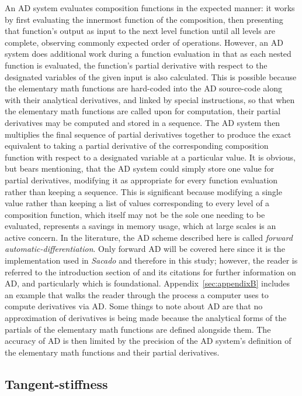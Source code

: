 \documentclass[preprint,12pt]{elsarticle}
\begin{document}
An AD system evaluates composition functions in the expected manner: it works by first evaluating the innermost function of the composition, then presenting that function's output as input to the next level function until all levels are complete, observing commonly expected order of operations. However, an AD system does additional work during a function evaluation in that as each nested function is evaluated, the function's partial derivative with respect to the designated variables of the given input is also calculated.  This is possible because the elementary math functions are hard-coded into the AD source-code along with their analytical derivatives, and linked by special instructions, so that when the elementary math functions are called upon for computation, their partial derivatives may be computed and stored in a sequence. The AD system then multiplies the final sequence of partial derivatives together to produce the exact equivalent to taking a partial derivative of the corresponding composition function with respect to a designated variable at a particular value. It is obvious, but bears mentioning, that the AD system could simply store one value for partial derivatives, modifying it as appropriate for every function evaluation rather than keeping a sequence. This is significant because modifying a single value rather than keeping a list of values corresponding to
every level of a composition function, which itself may not be the sole one needing to be evaluated, represents a savings in memory usage, which at large scales is an active concern. In the literature, the AD scheme described here is called \emph{forward automatic-differentiation}. Only forward AD will be covered here since it is the implementation used in \emph{Sacado} and therefore in this study; however, the reader is referred to the introduction section of \cite{ref-AD-methods} and its citations for further information on AD, and particularly \cite{ref-on-AD} which is foundational.  Appendix~\ref{sec:appendixB} includes an example that walks the reader through the process a computer uses to compute derivatives via AD.  Some things to note about AD are that no approximation of derivatives is being made because the analytical forms of the partials of the elementary math functions are defined alongside them. The accuracy of AD is then limited by the precision of the AD system's definition of the elementary math functions and their partial derivatives.
 
\subsection{Tangent-stiffness} 
\end{document}
